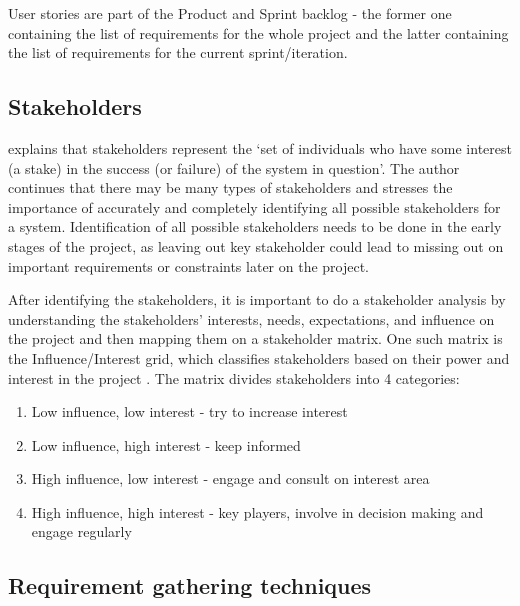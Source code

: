 User stories are part of the Product and Sprint backlog - the former one containing the list of requirements for the whole project and the latter containing the list of requirements for the current sprint/iteration.

\subsection{Stakeholders}

\textcite[34]{requirements} explains that stakeholders represent the `set of individuals who have some interest (a stake) in the success (or failure) of the system in question'. The author continues that there may be many types of stakeholders and stresses the importance of accurately and completely identifying all possible stakeholders for a system. Identification of all possible stakeholders needs to be done in the early stages of the project, as leaving out key stakeholder could lead to missing out on important requirements or constraints later on the project. 

After identifying the stakeholders, it is important to do a stakeholder analysis by understanding the stakeholders' interests, needs, expectations, and influence on the project and then mapping them on a stakeholder matrix. One such matrix is the Influence/Interest grid, which classifies stakeholders based on their power and interest in the project \parencite{stakeholders}. The matrix divides stakeholders into 4 categories:
\begin{enumerate}
    \item Low influence, low interest - try to increase interest
    \item Low influence, high interest - keep informed 
    \item High influence, low interest - engage and consult on interest area
    \item High influence, high interest - key players, involve in decision making and engage regularly
\end{enumerate}

\subsection{Requirement gathering techniques}

